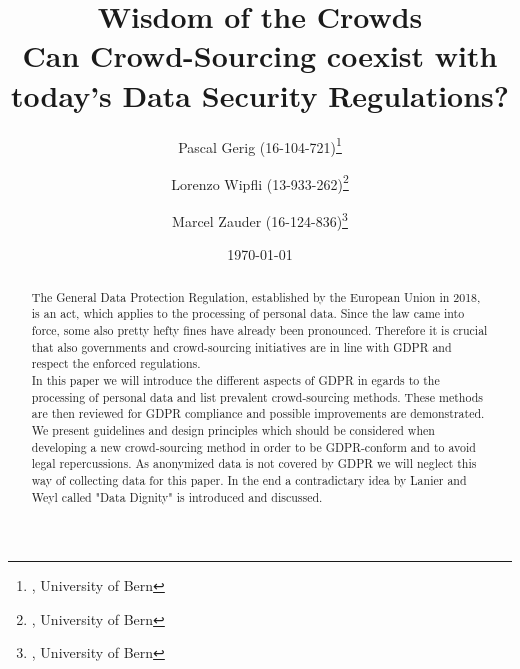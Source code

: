 \documentclass[a4paper,12pt]{report}
\begin{document}

	\title{Wisdom of the Crowds \\ Can Crowd-Sourcing coexist with today’s Data Security Regulations?} %

	\author{Pascal Gerig (16-104-721)\thanks{, University of Bern}
   		\and Lorenzo Wipfli  (13-933-262)\thanks{, University of Bern}
   		\and Marcel Zauder  (16-124-836)\thanks{, University of Bern}
   	}	%



	\date{\today} %

	\maketitle

	\begin{abstract}
		The General Data Protection Regulation, established by the European Union in 2018, is an act, which applies to the processing of personal data. Since the law came into force, some also pretty hefty fines have already been pronounced. Therefore it is crucial that also governments and crowd-sourcing initiatives are in line with GDPR and respect the enforced regulations. \\
		In this paper we will introduce the different aspects of GDPR in egards to the processing of personal data and list prevalent crowd-sourcing methods. These methods are then reviewed for GDPR compliance and possible improvements are demonstrated. We present guidelines and design principles which should be considered when developing a new crowd-sourcing method in order to be GDPR-conform and to avoid legal repercussions. As anonymized data is not covered by GDPR we will neglect this way of collecting data for this paper. In the end a contradictary idea by Lanier and Weyl called "Data Dignity" is introduced and discussed.

	\end{abstract}
\end{document}
